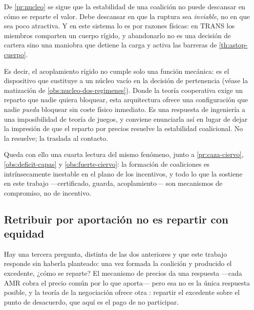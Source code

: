 \begin{observacion}
\label{obs:nucleo-acoplamiento}
De \cref{pr:nucleo} se sigue que la estabilidad de una coalición no puede
descansar en cómo se reparte el valor. Debe descansar en que la ruptura sea
\emph{inviable}, no en que sea poco atractiva. Y en este sistema lo es por
razones físicas: en \textsf{TRANS} los miembros comparten un cuerpo rígido, y
abandonarlo no es una decisión de cartera sino una maniobra que detiene la carga
y activa las barreras de \cref{th:astop-cuerpo}.

Es decir, el acoplamiento rígido no cumple solo una función mecánica: es el
dispositivo que sustituye a un núcleo vacío en la decisión de pertenencia
(véase la matización de \cref{obs:nucleo-dos-regimenes}). Donde la teoría cooperativa exige
un reparto que nadie quiera bloquear, esta arquitectura ofrece una configuración
que nadie \emph{pueda} bloquear sin coste físico inmediato. Es una respuesta de
ingeniería a una imposibilidad de teoría de juegos, y conviene enunciarla así en
lugar de dejar la impresión de que el reparto por precios resuelve la
estabilidad coalicional. No la resuelve; la traslada al contacto.

Queda con ello una cuarta lectura del mismo fenómeno, junto a
\cref{pr:caza-ciervo}, \cref{obs:deficit-capas} y \cref{obs:fuerte-ciervo}: la
formación de coaliciones es intrínsecamente inestable en el plano de los
incentivos, y todo lo que la sostiene en este trabajo —certificado, guarda,
acoplamiento— son mecanismos de compromiso, no de incentivo.
\end{observacion}

\subsection{Retribuir por aportación no es repartir con equidad}

Hay una tercera pregunta, distinta de las dos anteriores y que este trabajo
responde sin haberla planteado: una vez formada la coalición y producido el
excedente, ¿cómo se reparte? El mecanismo de precios da una respuesta
—cada AMR cobra el precio común por lo que aporta— pero esa no es la única
respuesta posible, y la teoría de la negociación ofrece otra
\cite{clempner2024optimization}: repartir el excedente sobre el punto de
desacuerdo, que aquí es el pago de no participar.

